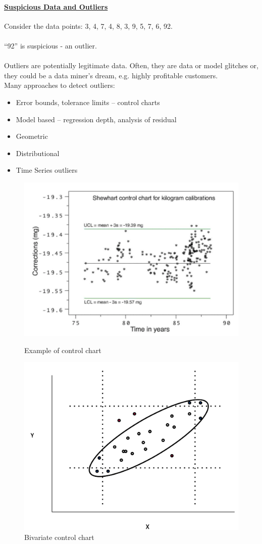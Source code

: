\documentclass[10pt,a4paper]{article}
\newcommand{\nline}{\\~\\}
\begin{document}
\paragraph{\uline{Suspicious Data and Outliers}}
Consider the data points: 3, 4, 7, 4, 8, 3, 9, 5, 7, 6, 92. \nline
“92” is suspicious - an outlier. \nline 
Outliers are potentially legitimate data. Often, they are data or model glitches or, they could be a data miner’s dream, e.g. highly profitable customers. \\
Many approaches to detect outliers:
\begin{itemize}
	\item Error bounds, tolerance limits – control charts
	\item Model based – regression depth, analysis of residual
	\item Geometric
	\item Distributional
	\item Time Series outliers
\end{itemize}
\begin{figure}[h!]
\begin{minipage}{.5\textwidth}
  \centering
  \includegraphics[width=.8\linewidth]{images/control-charts}
  \caption{Example of control chart}
\end{minipage}%
\begin{minipage}{.5\textwidth}
  \centering
  \includegraphics[width=.8\linewidth]{images/bivariate-charts}
    \caption{Bivariate control chart}
\end{minipage}
\end{figure}
\clearpage
\end{document}
